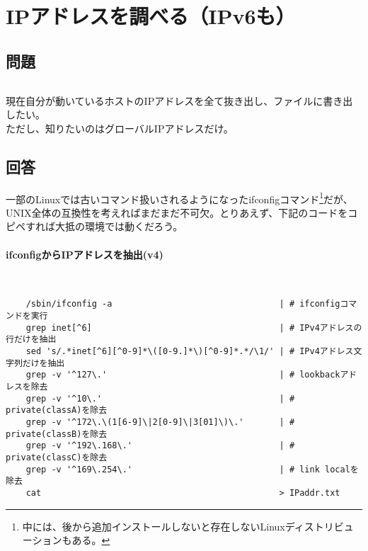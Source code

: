 \section{IPアドレスを調べる（IPv6も）}
\label{recipe:ifconfig}

\subsection*{問題}
\noindent
$\!\!\!\!\!$
\begin{grshfboxit}{160.0mm}
	現在自分が動いているホストのIPアドレスを全て抜き出し、ファイルに書き出したい。 \\
	ただし、知りたいのはグローバルIPアドレスだけ。
\end{grshfboxit}

\subsection*{回答}
一部のLinuxでは古いコマンド扱いされるようになったifconfigコマンド\footnote{中には、後から追加インストールしないと存在しないLinuxディストリビューションもある。}だが、
UNIX全体の互換性を考えればまだまだ不可欠。とりあえず、下記のコードをコピペすれば大抵の環境では動くだろう。

\paragraph{ifconfigからIPアドレスを抽出(v4)} 　\\
\begin{frameboxit}{160.0mm}
\begin{verbatim}
	/sbin/ifconfig -a                                 | # ifconfigコマンドを実行
	grep inet[^6]                                     | # IPv4アドレスの行だけを抽出
	sed 's/.*inet[^6][^0-9]*\([0-9.]*\)[^0-9]*.*/\1/' | # IPv4アドレス文字列だけを抽出
	grep -v '^127\.'                                  | # lookbackアドレスを除去
	grep -v '^10\.'                                   | # private(classA)を除去
	grep -v '^172\.\(1[6-9]\|2[0-9]\|3[01]\)\.'       | # private(classB)を除去
	grep -v '^192\.168\.'                             | # private(classC)を除去
	grep -v '^169\.254\.'                             | # link localを除去
	cat                                               > IPaddr.txt
\end{verbatim}
\end{frameboxit}
